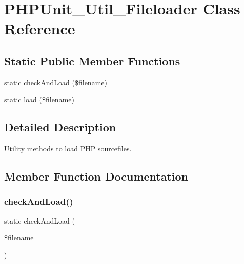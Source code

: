 \hypertarget{class_p_h_p_unit___util___fileloader}{}\section{P\+H\+P\+Unit\+\_\+\+Util\+\_\+\+Fileloader Class Reference}
\label{class_p_h_p_unit___util___fileloader}
\subsection*{Static Public Member Functions}
\begin{DoxyCompactItemize}
\item 
static \mbox{\hyperlink{class_p_h_p_unit___util___fileloader_a9aebcfadec6f2c07311faab7e61c2a4a}{check\+And\+Load}} (\$filename)
\item 
static \mbox{\hyperlink{class_p_h_p_unit___util___fileloader_a276901c86c421cd1f52662cb0f0b7a14}{load}} (\$filename)
\end{DoxyCompactItemize}


\subsection{Detailed Description}
Utility methods to load P\+HP sourcefiles. 

\subsection{Member Function Documentation}
\mbox{\label{class_p_h_p_unit___util___fileloader_a9aebcfadec6f2c07311faab7e61c2a4a}} 
\subsubsection{\texorpdfstring{check\+And\+Load()}{checkAndLoad()}}
{\footnotesize\ttfamily static check\+And\+Load (\begin{DoxyParamCaption}\item[{}]{\$filename }\end{DoxyParamCaption})\hspace{0.3cm}{\ttfamily [static]}}

